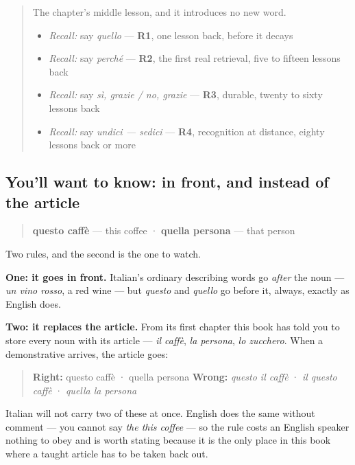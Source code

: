 \label{lesson:IT-C33-questo-caffe}



\begin{quote}
The chapter's middle lesson, and it introduces no new word.

\begin{itemize}
\raggedright
  \item \emph{Recall:} say \emph{quello} — \textbf{R1}, one lesson back, before it decays
  \item \emph{Recall:} say \emph{perché} — \textbf{R2}, the first real retrieval, five to fifteen lessons back
  \item \emph{Recall:} say \emph{sì, grazie / no, grazie} — \textbf{R3}, durable, twenty to sixty lessons back
  \item \emph{Recall:} say \emph{undici — sedici} — \textbf{R4}, recognition at distance, eighty lessons back or more
\end{itemize}
\end{quote}

\subsection*{You'll want to know: in front, and instead of the article}
\begin{quote}
\textbf{questo caffè} — this coffee · \textbf{quella persona} — that person
\end{quote}

Two rules, and the second is the one to watch.

\textbf{One: it goes in front.} Italian's ordinary describing words go \emph{after} the noun — \emph{un vino rosso}, a red wine — but \emph{questo} and \emph{quello} go before it, always, exactly as English does.

\textbf{Two: it replaces the article.} From its first chapter this book has told you to store every noun with its article — \emph{il caffè}, \emph{la persona}, \emph{lo zucchero}. When a demonstrative arrives, the article goes:

\begin{quote}
\textbf{Right:} questo caffè · quella persona \textbf{Wrong:} \emph{questo il caffè} · \emph{il questo caffè} · \emph{quella la persona}
\end{quote}

Italian will not carry two of these at once. English does the same without comment — you cannot say \emph{the this coffee} — so the rule costs an English speaker nothing to obey and is worth stating because it is the only place in this book where a taught article has to be taken back out.

